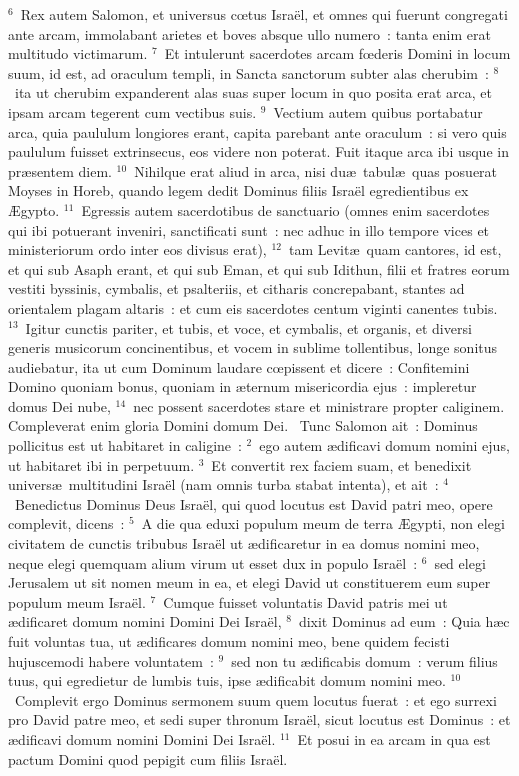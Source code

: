 ${}^{6}$~Rex autem Salomon, et universus cœtus Isra\"el, et omnes qui fuerunt congregati ante arcam, immolabant arietes et boves absque ullo numero~: tanta enim erat multitudo victimarum.
${}^{7}$~Et intulerunt sacerdotes arcam fœderis Domini in locum suum, id est, ad oraculum templi, in Sancta sanctorum subter alas cherubim~:
${}^{8}$~ita ut cherubim expanderent alas suas super locum in quo posita erat arca, et ipsam arcam tegerent cum vectibus suis.
${}^{9}$~Vectium autem quibus portabatur arca, quia paululum longiores erant, capita parebant ante oraculum~: si vero quis paululum fuisset extrinsecus, eos videre non poterat. Fuit itaque arca ibi usque in pr\ae sentem diem.
${}^{10}$~Nihilque erat aliud in arca, nisi du\ae\ tabul\ae\ quas posuerat Moyses in Horeb, quando legem dedit Dominus filiis Isra\"el egredientibus ex \AE gypto.
${}^{11}$~Egressis autem sacerdotibus de sanctuario (omnes enim sacerdotes qui ibi potuerant inveniri, sanctificati sunt~: nec adhuc in illo tempore vices et ministeriorum ordo inter eos divisus erat),
${}^{12}$~tam Levit\ae\ quam cantores, id est, et qui sub Asaph erant, et qui sub Eman, et qui sub Idithun, filii et fratres eorum vestiti byssinis, cymbalis, et psalteriis, et citharis concrepabant, stantes ad orientalem plagam altaris~: et cum eis sacerdotes centum viginti canentes tubis.
${}^{13}$~Igitur cunctis pariter, et tubis, et voce, et cymbalis, et organis, et diversi generis musicorum concinentibus, et vocem in sublime tollentibus, longe sonitus audiebatur, ita ut cum Dominum laudare cœpissent et dicere~: Confitemini Domino quoniam bonus, quoniam in \ae ternum misericordia ejus~: impleretur domus Dei nube,
${}^{14}$~nec possent sacerdotes stare et ministrare propter caliginem. Compleverat enim gloria Domini domum Dei.
~\lettrine[lines=10,image=true,loversize=0.05,lraise=-0.03]{T}{}unc Salomon ait~: Dominus pollicitus est ut habitaret in caligine~:
${}^{2}$~ego autem \ae dificavi domum nomini ejus, ut habitaret ibi in perpetuum.
${}^{3}$~Et convertit rex faciem suam, et benedixit univers\ae\ multitudini Isra\"el (nam omnis turba stabat intenta), et ait~:
${}^{4}$~Benedictus Dominus Deus Isra\"el, qui quod locutus est David patri meo, opere complevit, dicens~:
${}^{5}$~A die qua eduxi populum meum de terra \AE gypti, non elegi civitatem de cunctis tribubus Isra\"el ut \ae dificaretur in ea domus nomini meo, neque elegi quemquam alium virum ut esset dux in populo Isra\"el~:
${}^{6}$~sed elegi Jerusalem ut sit nomen meum in ea, et elegi David ut constituerem eum super populum meum Isra\"el.
${}^{7}$~Cumque fuisset voluntatis David patris mei ut \ae dificaret domum nomini Domini Dei Isra\"el,
${}^{8}$~dixit Dominus ad eum~: Quia h\ae c fuit voluntas tua, ut \ae dificares domum nomini meo, bene quidem fecisti hujuscemodi habere voluntatem~:
${}^{9}$~sed non tu \ae dificabis domum~: verum filius tuus, qui egredietur de lumbis tuis, ipse \ae dificabit domum nomini meo.
${}^{10}$~Complevit ergo Dominus sermonem suum quem locutus fuerat~: et ego surrexi pro David patre meo, et sedi super thronum Isra\"el, sicut locutus est Dominus~: et \ae dificavi domum nomini Domini Dei Isra\"el.
${}^{11}$~Et posui in ea arcam in qua est pactum Domini quod pepigit cum filiis Isra\"el.


